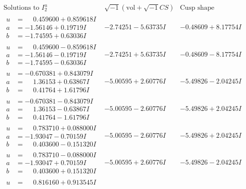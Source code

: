 \documentclass[1p]{elsarticle_modified}
\theoremstyle{definition}
\newcommand{\I}{\sqrt{-1}}
\begin{document}
$$\begin{array}{c|c|c}  
\text{Solutions to }I^u_{2}& \I (\text{vol} + \sqrt{-1}CS) & \text{Cusp shape}\\
 \hline 
\begin{aligned}
u &= \phantom{-}0.459600 + 0.859618 I \\
a &= -1.56146 + 0.19719 I \\
b &= -1.74595 + 0.63036 I\end{aligned}
 & -2.74251 - 5.63735 I & -0.48609 + 8.17754 I \\ \hline\begin{aligned}
u &= \phantom{-}0.459600 - 0.859618 I \\
a &= -1.56146 - 0.19719 I \\
b &= -1.74595 - 0.63036 I\end{aligned}
 & -2.74251 + 5.63735 I & -0.48609 - 8.17754 I \\ \hline\begin{aligned}
u &= -0.670381 + 0.843079 I \\
a &= \phantom{-}1.36153 + 0.63867 I \\
b &= \phantom{-}0.41764 + 1.61796 I\end{aligned}
 & -5.00595 + 2.60776 I & -5.49826 - 2.04245 I \\ \hline\begin{aligned}
u &= -0.670381 - 0.843079 I \\
a &= \phantom{-}1.36153 - 0.63867 I \\
b &= \phantom{-}0.41764 - 1.61796 I\end{aligned}
 & -5.00595 - 2.60776 I & -5.49826 + 2.04245 I \\ \hline\begin{aligned}
u &= \phantom{-}0.783710 + 0.088000 I \\
a &= -1.93047 - 0.70159 I \\
b &= \phantom{-}0.403600 - 0.151320 I\end{aligned}
 & -5.00595 - 2.60776 I & -5.49826 + 2.04245 I \\ \hline\begin{aligned}
u &= \phantom{-}0.783710 - 0.088000 I \\
a &= -1.93047 + 0.70159 I \\
b &= \phantom{-}0.403600 + 0.151320 I\end{aligned}
 & -5.00595 + 2.60776 I & -5.49826 - 2.04245 I \\ \hline\begin{aligned}
u &= \phantom{-}0.816160 + 0.913545 I \\

\end{aligned}
\end{array}$$
\end{document}
